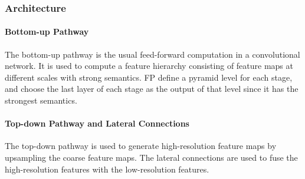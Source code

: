     \subsubsection{Architecture}

      \paragraph{Bottom-up Pathway}

        The bottom-up pathway is the usual feed-forward computation in a convolutional
        network. It is used to compute a feature hierarchy consisting of feature maps
        at different scales with strong semantics\cite{lin2017feature}. FP define a
        pyramid level for each stage, and choose the last layer of each stage as the
        output of that level since it has the strongest semantics\cite{lin2017feature}.

      \paragraph{Top-down Pathway and Lateral Connections}

        The top-down pathway is used to generate high-resolution feature maps by upsampling
        the coarse feature maps. The lateral connections are used to fuse the high-resolution
        features with the low-resolution features\cite{lin2017feature}.
